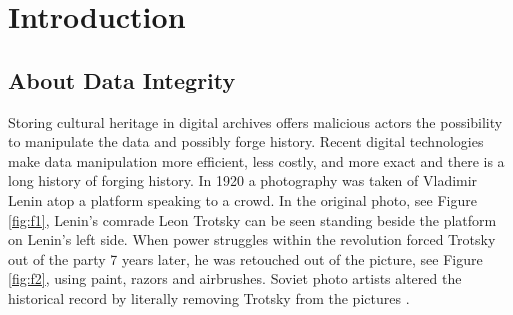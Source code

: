 \documentclass[final]{vutinfth}
\begin{document}
\mainmatter

\chapter{Introduction}
\section{About Data Integrity}
Storing cultural heritage in digital archives offers malicious actors the possibility to manipulate the data and possibly forge history. Recent digital technologies make data manipulation more efficient, less costly, and more exact and there is a long history of forging history. 
In 1920 a photography was taken of Vladimir Lenin atop a platform speaking to a crowd. In the original photo, see Figure \ref{fig:f1}, Lenin's comrade Leon Trotsky can be seen standing beside the platform on Lenin's left side. When power struggles within the revolution forced Trotsky out of the party 7 years later, he was retouched out of the picture, see Figure \ref{fig:f2}, using paint, razors and airbrushes. Soviet photo artists altered the historical record by literally removing Trotsky from the pictures \cite[3]{hofer2005digital}.
\end{document}
